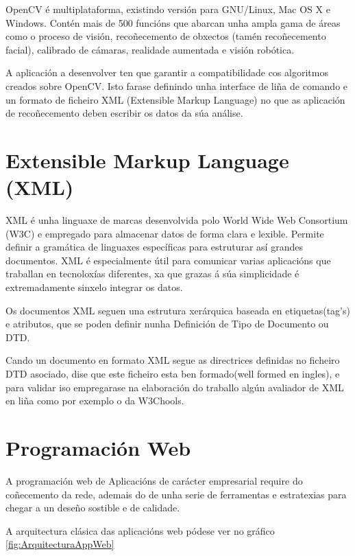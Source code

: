 		OpenCV é multiplataforma, existindo versión para GNU/Linux, Mac OS X e Windows. Contén mais 
		de 500 funcións que abarcan unha ampla gama de áreas como o proceso de visión, recoñecemento
		de obxectos (tamén recoñecemento facial), calibrado de cámaras, realidade aumentada e visión
		robótica.
		
		A aplicación a desenvolver ten que garantir a compatibilidade cos algoritmos creados sobre
		OpenCV. Isto farase definindo unha interface de liña de comando e un formato de ficheiro XML
		(Extensible Markup Language) no que as aplicación de recoñecemento deben escribir os datos da
		súa análise.
		
\section{Extensible Markup Language (XML)}
	XML é unha linguaxe de marcas desenvolvida polo World Wide Web Consortium (W3C) e empregado
	para almacenar datos de forma clara e lexible. Permite definir a gramática de linguaxes 
	específicas para estruturar así grandes documentos.
	XML é especialmente útil para comunicar varias aplicacións que traballan en tecnoloxías 
	diferentes, xa que grazas á súa simplicidade é extremadamente sinxelo integrar os datos.
	
	Os documentos XML seguen una estrutura xerárquica baseada en etiquetas(tag's) e atributos,
	que se poden definir nunha Definición de Tipo de Documento ou DTD. \cite{dtd-web-page}
	
	Cando un documento en formato XML segue as directrices definidas no ficheiro DTD asociado,
	dise que este ficheiro esta ben formado(well formed en ingles), e para validar iso empregarase
	na elaboración do traballo algún avaliador de XML en liña como por exemplo o da W3Chools.\cite{xml-validator}
	
\section{Programación Web}

	A programación web de Aplicacións de carácter empresarial require do coñecemento da rede, ademais
	do de unha serie de ferramentas e estratexias para chegar a un deseño sostible e de calidade.
	
	A arquitectura clásica das aplicacións web pódese ver no gráfico \ref{fig:ArquitecturaAppWeb}
	

